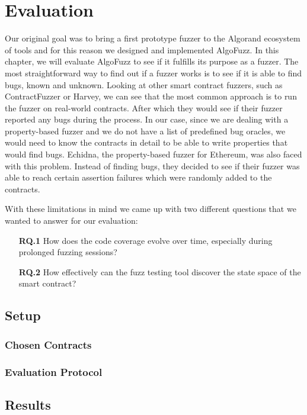 
\chapter{Evaluation}\label{chapter:evaluation}
Our original goal was to bring a first prototype fuzzer to the Algorand ecosystem of tools and for this reason we designed and implemented AlgoFuzz.
In this chapter, we will evaluate AlgoFuzz to see if it fulfills its purpose as a fuzzer.
The most straightforward way to find out if a fuzzer works is to see if it is able to find bugs, known and unknown.
Looking at other smart contract fuzzers, such as ContractFuzzer or Harvey, we can see that the most common approach is to run the fuzzer on real-world contracts.
After which they would see if their fuzzer reported any bugs during the process.
In our case, since we are dealing with a property-based fuzzer and we do not have a list of predefined bug oracles, we would need to know the contracts in detail to be able to write properties that would find bugs.
Echidna, the property-based fuzzer for Ethereum, was also faced with this problem.
Instead of finding bugs, they decided to see if their fuzzer was able to reach certain assertion failures which were randomly added to the contracts.

With these limitations in mind we came up with two different questions that we wanted to answer for our evaluation:
\begin{enumerate}
    \item[\textbf{RQ.1}] How does the code coverage evolve over time, especially during prolonged fuzzing sessions?

    \item[\textbf{RQ.2}] How effectively can the fuzz testing tool discover the state space of the smart contract?
\end{enumerate}





\section{Setup}

\subsection*{Chosen Contracts}

\subsection*{Evaluation Protocol}

\section{Results}